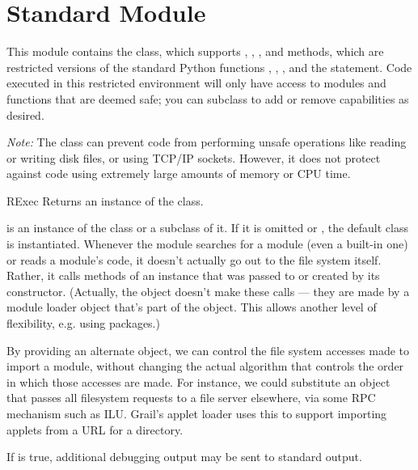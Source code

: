 \section{Standard Module }
\label{module-rexec}

This module contains the  class, which supports
, , , and
 methods, which are restricted versions of the standard
Python functions , , , and
the  statement.
Code executed in this restricted environment will
only have access to modules and functions that are deemed safe; you
can subclass  to add or remove capabilities as desired.

\emph{Note:} The  class can prevent code from performing
unsafe operations like reading or writing disk files, or using TCP/IP
sockets.  However, it does not protect against code using extremely
large amounts of memory or CPU time.  

\begin{funcdesc}{RExec}{}
Returns an instance of the  class.  

 is an instance of the  class or a subclass of it.
If it is omitted or , the default  class is
instantiated.
Whenever the  module searches for a module (even a
built-in one) or reads a module's code, it doesn't actually go out to
the file system itself.  Rather, it calls methods of an 
instance that was passed to or created by its constructor.  (Actually,
the  object doesn't make these calls --- they are made by
a module loader object that's part of the  object.  This
allows another level of flexibility, e.g. using packages.)

By providing an alternate  object, we can control the
file system accesses made to import a module, without changing the
actual algorithm that controls the order in which those accesses are
made.  For instance, we could substitute an  object that
passes all filesystem requests to a file server elsewhere, via some
RPC mechanism such as ILU.  Grail's applet loader uses this to support
importing applets from a URL for a directory.

If  is true, additional debugging output may be sent to
standard output.
\end{funcdesc}

